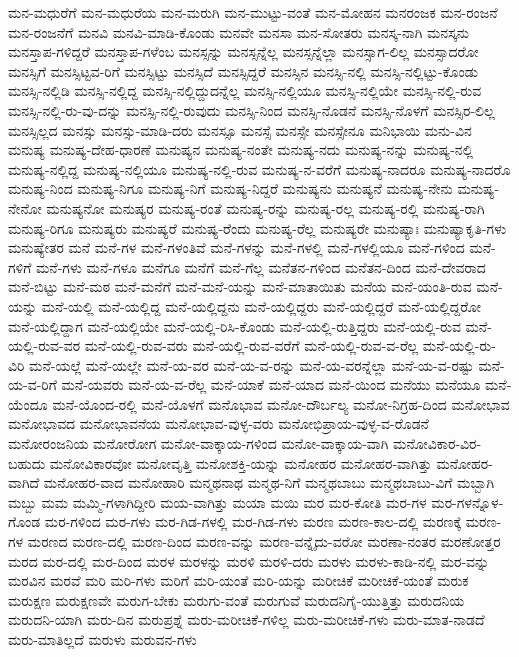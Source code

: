 {ಮನ-ಮಧುರೆಗೆ
ಮನ-ಮಧುರೆಯ
ಮನ-ಮರುಗಿ
ಮನ-ಮುಟ್ಟು-ವಂತೆ
ಮನ-ಮೋಹನ
ಮನರಂಜಕ
ಮನ-ರಂಜನೆ
ಮನ-ರಂಜನೆಗೆ
ಮನವಿ
ಮನವಿ-ಮಾಡಿ-ಕೊಂಡು
ಮನವೇ
ಮನಸಾ
ಮನ-ಸೋತರು
ಮನಸ್ಕ-ನಾಗಿ
ಮನಸ್ಕನು
ಮನಸ್ತಾಪ-ಗಳಿದ್ದರೆ
ಮನಸ್ತಾಪ-ಗಳೆಂಬ
ಮನಸ್ಸನ್ನು
ಮನಸ್ಸನ್ನೆಲ್ಲ
ಮನಸ್ಸನ್ನೆಲ್ಲಾ
ಮನಸ್ಸಾಗ-ಲಿಲ್ಲ
ಮನಸ್ಸಾದರೋ
ಮನಸ್ಸಿಗೆ
ಮನಸ್ಸಿಟ್ಟವ-ರಿಗೆ
ಮನಸ್ಸಿಟ್ಟು
ಮನಸ್ಸಿದೆ
ಮನಸ್ಸಿದ್ದರೆ
ಮನಸ್ಸಿನ
ಮನಸ್ಸಿ-ನಲ್ಲಿ
ಮನಸ್ಸಿ-ನಲ್ಲಿಟ್ಟು-ಕೊಂಡು
ಮನಸ್ಸಿ-ನಲ್ಲಿಡಿ
ಮನಸ್ಸಿ-ನಲ್ಲಿದ್ದ
ಮನಸ್ಸಿ-ನಲ್ಲಿದ್ದುದನ್ನೆಲ್ಲ
ಮನಸ್ಸಿ-ನಲ್ಲಿಯೂ
ಮನಸ್ಸಿ-ನಲ್ಲಿಯೇ
ಮನಸ್ಸಿ-ನಲ್ಲಿ-ರುವ
ಮನಸ್ಸಿ-ನಲ್ಲಿ-ರು-ವು-ದನ್ನು
ಮನಸ್ಸಿ-ನಲ್ಲಿ-ರುವುದು
ಮನಸ್ಸಿ-ನಿಂದ
ಮನಸ್ಸಿ-ನೊಡನೆ
ಮನಸ್ಸಿ-ನೊಳಗೆ
ಮನಸ್ಸಿರ-ಲಿಲ್ಲ
ಮನಸ್ಸಿಲ್ಲದ
ಮನಸ್ಸು
ಮನಸ್ಸು-ಮಾಡಿ-ದರು
ಮನಸ್ಸೂ
ಮನಸ್ಸೆ
ಮನಸ್ಸೇ
ಮನಸ್ಸೇನೂ
ಮನಿಭಾಯಿ
ಮನು-ವಿನ
ಮನುಷ್ಯ
ಮನುಷ್ಯ-ದೇಹ-ಧಾರಣೆ
ಮನುಷ್ಯನ
ಮನುಷ್ಯ-ನಂತೇ
ಮನುಷ್ಯ-ನದು
ಮನುಷ್ಯ-ನನ್ನು
ಮನುಷ್ಯ-ನಲ್ಲಿ
ಮನುಷ್ಯ-ನಲ್ಲಿದ್ದ
ಮನುಷ್ಯ-ನಲ್ಲಿಯೂ
ಮನುಷ್ಯ-ನಲ್ಲಿ-ರುವ
ಮನುಷ್ಯ-ನ-ವರೆಗೆ
ಮನುಷ್ಯ-ನಾದರೂ
ಮನುಷ್ಯ-ನಾದರೊ
ಮನುಷ್ಯ-ನಿಂದ
ಮನುಷ್ಯ-ನಿಗೂ
ಮನುಷ್ಯ-ನಿಗೆ
ಮನುಷ್ಯ-ನಿದ್ದರೆ
ಮನುಷ್ಯನು
ಮನುಷ್ಯನೆ
ಮನುಷ್ಯ-ನೇನು
ಮನುಷ್ಯ-ನೇನೋ
ಮನುಷ್ಯನೋ
ಮನುಷ್ಯರ
ಮನುಷ್ಯ-ರಂತೆ
ಮನುಷ್ಯ-ರನ್ನು
ಮನುಷ್ಯ-ರಲ್ಲ
ಮನುಷ್ಯ-ರಲ್ಲಿ
ಮನುಷ್ಯ-ರಾಗಿ
ಮನುಷ್ಯ-ರಿಗೂ
ಮನುಷ್ಯರು
ಮನುಷ್ಯರೆ
ಮನುಷ್ಯ-ರೆಂದು
ಮನುಷ್ಯ-ರೆಲ್ಲ
ಮನುಷ್ಯರೇ
ಮನುಷ್ಯಾಃ
ಮನುಷ್ಯಾಕೃತಿ-ಗಳು
ಮನುಷ್ಯೇತರ
ಮನೆ
ಮನೆ-ಗಳ
ಮನೆ-ಗಳಂತಿವೆ
ಮನೆ-ಗಳನ್ನು
ಮನೆ-ಗಳಲ್ಲಿ
ಮನೆ-ಗಳಲ್ಲಿಯೂ
ಮನೆ-ಗಳಿಂದ
ಮನೆ-ಗಳಿಗೆ
ಮನೆ-ಗಳು
ಮನೆ-ಗಳೂ
ಮನೆಗೂ
ಮನೆಗೆ
ಮನೆ-ಗೆಲ್ಲ
ಮನೆತನ-ಗಳಿಂದ
ಮನೆತನ-ದಿಂದ
ಮನೆ-ದೇವರಾದ
ಮನೆ-ಬಿಟ್ಟು
ಮನೆ-ಮಠ
ಮನೆ-ಮನೆಗೆ
ಮನೆ-ಮನೆ-ಯನ್ನು
ಮನೆ-ಮಾತಾಯಿತು
ಮನೆಯ
ಮನೆ-ಯಂತಿ-ರುವ
ಮನೆ-ಯನ್ನು
ಮನೆ-ಯಲ್ಲಿ
ಮನೆ-ಯಲ್ಲಿದ್ದ
ಮನೆ-ಯಲ್ಲಿದ್ದನು
ಮನೆ-ಯಲ್ಲಿದ್ದರು
ಮನೆ-ಯಲ್ಲಿದ್ದರೆ
ಮನೆ-ಯಲ್ಲಿದ್ದರೋ
ಮನೆ-ಯಲ್ಲಿದ್ದಾಗ
ಮನೆ-ಯಲ್ಲಿಯೇ
ಮನೆ-ಯಲ್ಲಿ-ರಿಸಿ-ಕೊಂಡು
ಮನೆ-ಯಲ್ಲಿ-ರುತ್ತಿದ್ದರು
ಮನೆ-ಯಲ್ಲಿ-ರುವ
ಮನೆ-ಯಲ್ಲಿ-ರುವ-ವರ
ಮನೆ-ಯಲ್ಲಿ-ರುವ-ವರು
ಮನೆ-ಯಲ್ಲಿ-ರುವ-ವರೆಗೆ
ಮನೆ-ಯಲ್ಲಿ-ರುವ-ವ-ರೆಲ್ಲ
ಮನೆ-ಯಲ್ಲಿ-ರು-ವಿರಿ
ಮನೆ-ಯಲ್ಲೆ
ಮನೆ-ಯಲ್ಲೇ
ಮನೆ-ಯ-ವರ
ಮನೆ-ಯ-ವ-ರನ್ನು
ಮನೆ-ಯ-ವರನ್ನೆಲ್ಲಾ
ಮನೆ-ಯ-ವ-ರಷ್ಟು
ಮನೆ-ಯ-ವ-ರಿಗೆ
ಮನೆ-ಯವರು
ಮನೆ-ಯ-ವ-ರೆಲ್ಲ
ಮನೆ-ಯಾಕೆ
ಮನೆ-ಯಾದ
ಮನೆ-ಯಿಂದ
ಮನೆಯು
ಮನೆಯೂ
ಮನೆ-ಯೆಂದೂ
ಮನೆ-ಯೊಂದ-ರಲ್ಲಿ
ಮನೆ-ಯೊಳಗೆ
ಮನೊಭಾವ
ಮನೋ-ದೌರ್ಬಲ್ಯ
ಮನೋ-ನಿಗ್ರಹ-ದಿಂದ
ಮನೋಭಾವ
ಮನೋಭಾವದ
ಮನೋಭಾವನೆಯ
ಮನೋಭಾವ-ವುಳ್ಳ-ವರು
ಮನೋಭಿಪ್ರಾಯ-ವುಳ್ಳ-ವ-ರೊಡನೆ
ಮನೋರಂಜನಿಯ
ಮನೋರೋಗ
ಮನೋ-ವಾಕ್ಕಾಯ-ಗಳಿಂದ
ಮನೋ-ವಾಕ್ಕಾಯ-ವಾಗಿ
ಮನೋವಿಕಾರ-ವಿರ-ಬಹುದು
ಮನೋವಿಕಾರವೋ
ಮನೋವೃತ್ತಿ
ಮನೋಶಕ್ತಿ-ಯನ್ನು
ಮನೋಹರ
ಮನೋಹರ-ವಾಗಿತ್ತು
ಮನೋಹರ-ವಾಗಿದೆ
ಮನೋಹರ-ವಾದ
ಮನೋಹಾರಿ
ಮನ್ಮಥನಾಥ
ಮನ್ಮಥ-ನಿಗೆ
ಮನ್ಮಥಬಾಬು
ಮನ್ಮಥಬಾಬು-ವಿಗೆ
ಮಬ್ಬಾಗಿ
ಮಬ್ಬು
ಮಮ
ಮಮ್ಮಿ-ಗಳಾಗಿದ್ದೀರಿ
ಮಯ-ವಾಗಿತ್ತು
ಮಯಾ
ಮಯಿ
ಮರ
ಮರ-ಕೋತಿ
ಮರ-ಗಳ
ಮರ-ಗಳನ್ನೊಳ-ಗೊಂಡ
ಮರ-ಗಳಿಂದ
ಮರ-ಗಳು
ಮರ-ಗಿಡ-ಗಳಲ್ಲಿ
ಮರ-ಗಿಡ-ಗಳು
ಮರಣ
ಮರಣ-ಕಾಲ-ದಲ್ಲಿ
ಮರಣಕ್ಕೆ
ಮರಣ-ಗಳ
ಮರಣದ
ಮರಣ-ದಲ್ಲಿ
ಮರಣ-ದಿಂದ
ಮರಣ-ವನ್ನು
ಮರಣ-ವನ್ನೈದು-ವರೋ
ಮರಣಾ-ನಂತರ
ಮರಣೋತ್ತರ
ಮರದ
ಮರ-ದಲ್ಲಿ
ಮರ-ದಿಂದ
ಮರಳ
ಮರಳನ್ನು
ಮರಳಿ
ಮರಳಿ-ದರು
ಮರಳು
ಮರಳು-ಕಾಡಿ-ನಲ್ಲಿ
ಮರ-ವನ್ನು
ಮರವಿನ
ಮರವೆ
ಮರಿ
ಮರಿ-ಗಳು
ಮರಿಗೆ
ಮರಿ-ಯಂತೆ
ಮರಿ-ಯನ್ನು
ಮರೀಚಿಕೆ
ಮರೀಚಿಕೆ-ಯಂತೆ
ಮರುಕ
ಮರುಕ್ಷಣ
ಮರುಕ್ಷಣವೇ
ಮರುಗ-ಬೇಕು
ಮರುಗು-ವಂತೆ
ಮರುಗುವೆ
ಮರುದನಿಗೈ-ಯುತ್ತಿತ್ತು
ಮರುದನಿಯ
ಮರುದನಿ-ಯಾಗಿ
ಮರು-ದಿನ
ಮರುಪ್ರಶ್ನೆ
ಮರು-ಮರೀಚಿಕೆ-ಗಳಿಲ್ಲ
ಮರು-ಮರೀಚಿಕೆ-ಗಳು
ಮರು-ಮಾತ-ನಾಡದೆ
ಮರು-ಮಾತಿಲ್ಲದೆ
ಮರುಳು
ಮರುವನ-ಗಳು
}
